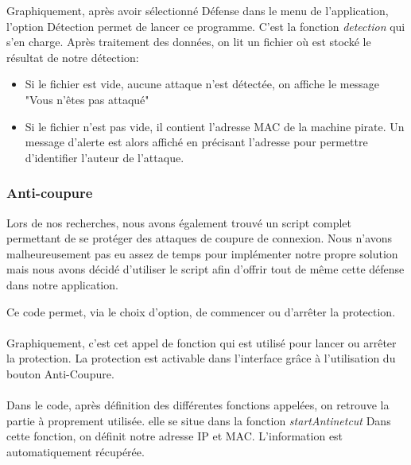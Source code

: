 \documentclass[11pt]{article}
\begin{document}
Graphiquement, après avoir sélectionné Défense dans le menu de l'application, l'option Détection permet de lancer ce programme. C'est la fonction \textit{detection} qui s'en charge. Après traitement des données, on lit un fichier où est stocké le résultat de notre détection:
\begin{itemize}
	\item Si le fichier est vide, aucune attaque n'est détectée, on affiche le message "Vous n'êtes pas attaqué"
	\item Si le fichier n'est pas vide, il contient l'adresse MAC de la machine pirate. Un message d'alerte est alors affiché en précisant l'adresse pour permettre d'identifier l'auteur de l'attaque.
	
\end{itemize}



\subsubsection{Anti-coupure}
Lors de nos recherches, nous avons également trouvé un script complet permettant de se protéger des attaques de coupure de connexion. Nous n'avons malheureusement pas eu assez de temps pour implémenter notre propre solution mais nous avons décidé d'utiliser le script afin d'offrir tout de même cette défense dans notre application.

Ce code permet, via le choix d'option, de commencer ou d'arrêter la protection. ~\\
	~\\
	
Graphiquement, c'est cet appel de fonction qui est utilisé pour lancer ou arrêter la protection. La protection est activable dans l'interface grâce à l'utilisation du bouton Anti-Coupure.~\\
	~\\	
	
	Dans le code, après définition des différentes fonctions appelées, on retrouve la partie à proprement utilisée. elle se situe dans la fonction \textit{startAntinetcut}	
	Dans cette fonction, on définit notre adresse IP et MAC. L'information est automatiquement récupérée.~\\
		~\\
		
\end{document}
